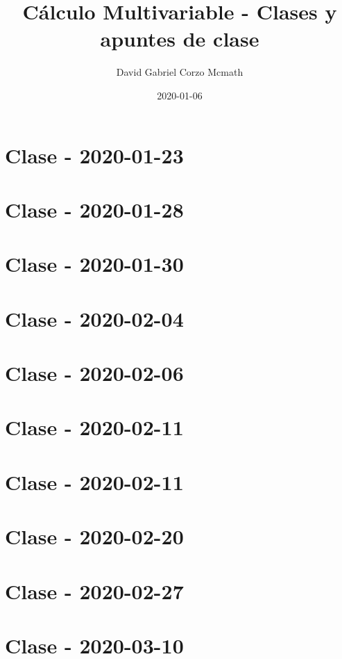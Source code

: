 \documentclass[openany]{book}
\title{Cálculo Multivariable - Clases y apuntes de clase}
\date{2020-01-06}
\author{David Gabriel Corzo Mcmath}
\begin{document}
\maketitle
\tableofcontents
\tikzblockdefinitions




\chapter{Clase - 2020-01-23}


\chapter{Clase - 2020-01-28}


\chapter{Clase - 2020-01-30}


\chapter{Clase - 2020-02-04}


\chapter{Clase - 2020-02-06}


\chapter{Clase - 2020-02-11}


\chapter{Clase - 2020-02-11}


\chapter{Clase - 2020-02-20}


\chapter{Clase - 2020-02-27}


\chapter{Clase - 2020-03-10}

\end{document}

